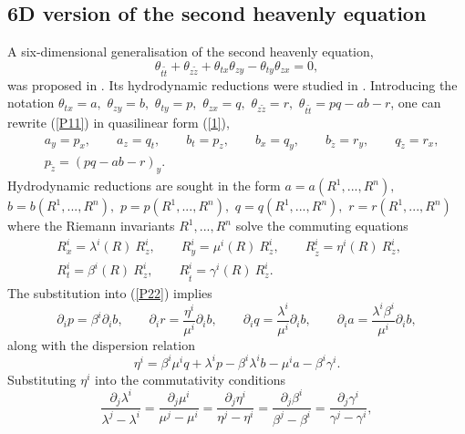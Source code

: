 \documentclass[12pt, a4paper]{article}
\theoremstyle{definition}
\begin{document}
\subsection{6D version of the second heavenly equation}

A six-dimensional generalisation of the second heavenly equation,
\begin{equation}
\theta_{t\tilde t}+\theta_{z\tilde z}+\theta_{tx}\theta_{zy}-\theta_{ty}\theta_{zx}=0,
\label{P11}
\end{equation}
was proposed in \cite{plebanski1996lagrangian}.
Its hydrodynamic reductions were studied in  \cite{ferapontov2004integrability}. Introducing  the notation $\theta_{tx}=a, $ $ \theta_{zy}=b, $ 
$ \theta_{ty}=p, $ $ \theta_{zx}=q, $ $\theta_{z\tilde z}=r,$ $ \theta_{t\tilde t}=pq-ab-r$, one can rewrite 
(\ref{P11}) in quasilinear form (\ref{1}),
\begin{equation}
\begin{split}
&a_y=p_x, \qquad a_z=q_t, \qquad b_t=p_z, \qquad b_x=q_y, \qquad b_{\tilde z}=r_y, \qquad q_{\tilde z}=r_x,\\
& p_{\tilde z}=(pq-ab-r)_y.
\end{split}
\label{P22}
\end{equation}
Hydrodynamic reductions are sought in the form $a=a(R^1, ..., R^n),$ $b=b(R^1, ..., R^n),$ $p=p(R^1, ..., R^n),$ $q=q(R^1, ..., R^n), $  $r=r(R^1, ..., R^n)$ where the Riemann invariants $R^1, ..., R^n$  solve the commuting equations
\begin{align*}
&R^i_{x}=\lambda^i(R)\ R^i_{z}, \qquad  R^i_{ y}=\mu^i(R)\ R^i_{z}, \qquad R^i_{\tilde z}=\eta^i(R)\ R^i_{z}, \qquad \\
& R^i_{t}=\beta^i(R)\ R^i_{z}, \qquad R^i_{\tilde t}=\gamma^i(R)\ R^i_{z}.
\end{align*}
The substitution into (\ref{P22}) implies
\begin{equation}
\partial_i p=\beta^i\partial_i b, \qquad \partial_i r=\frac{\eta^i}{\mu^i}\partial_i b, \qquad \partial_iq=\frac{\lambda^i}{\mu^i}\partial_i b, \qquad \partial_i a=\frac{\lambda^i \beta^i}{\mu^i}\partial_i b,
\label{P4}
\end{equation}
along with the dispersion relation
\begin{equation}
\eta^i=\beta^i\mu^i q+\lambda^i p-\beta^i\lambda^i b-\mu^i a-\beta^i\gamma^i.
\label{P5}
\end{equation}
Substituting  $\eta^i$ into the commutativity conditions
$$
\frac{\partial_j\lambda
^i}{\lambda^j-\lambda^i}=\frac{\partial_j\mu^i}{\mu^j-\mu^i}=\frac{\partial_j\eta^i}{\eta^j-\eta^i}=
\frac{\partial_j\beta^i}{\beta^j-\beta^i}=\frac{\partial_j\gamma^i}{\gamma^j-\gamma^i},
$$
\end{document}
